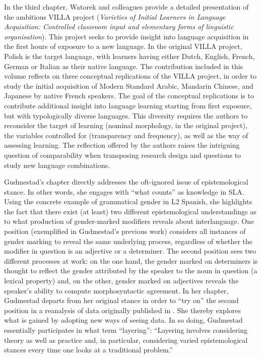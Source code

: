 \documentclass[output=paper]{../langscibook}
\begin{document}
{{In the third chapter, Watorek and colleagues provide a detailed presentation of the ambitious VILLA project (}}\textit{Varieties of Initial Learners in Language Acquisition: Controlled classroom input and elementary forms of linguistic organisation}{{). This project seeks to provide insight into language acquisition in the first hours of exposure to a new language. In the original VILLA project, Polish is the target language, with learners having either Dutch, English, French, German or Italian as their native language. The contribution included in this volume reflects on three conceptual replications of the VILLA project, in order to study the initial acquisition of Modern Standard Arabic, Mandarin Chinese, and Japanese by native French speakers. The goal of the conceptual replications is to contribute additional insight into language learning starting from first exposure, but with typologically diverse languages. This diversity requires the authors to reconsider the target of learning (nominal morphology, in the original project), the variables controlled for (transparency and frequency), as well as the way of assessing learning. The reflection offered by the authors raises the intriguing question of comparability when transposing research design and questions to study new language combinations.}}

{Gudmestad’s chapter directly addresses the oft-ignored issue of epistemological stance. In other words, she engages with ``what counts'' as knowledge in SLA. Using the concrete example of grammatical gender in L2 Spanish, she highlights the fact that there exist (at least) two different epistemological understandings as to what production of gender-marked modifiers reveals about interlanguage. One position (exemplified in Gudmestad’s previous work) considers all instances of gender marking to reveal the same underlying process, regardless of whether the modifier in question is an adjective or a determiner. The second position sees two different processes at work: on the one hand, the gender marked on determiners is thought to reflect the gender attributed by the speaker to the noun in question (a lexical property) and, on the other, gender marked on adjectives reveals the speaker’s ability to compute morphosyntactic agreement. In her chapter, Gudmestad departs from her original stance in order to ``try on'' the second position in a reanalysis of data originally published in \citet{GudmestadEtAl2019}. She thereby explores what is gained by adopting new ways of seeing data. In so doing, Gudmestad essentially participates in what \citet[214]{KingMackey2016} term “layering”:} “Layering involves considering theory as well as practice and, in particular, considering varied epistemological stances every time one looks at a traditional problem.”
\end{document}
